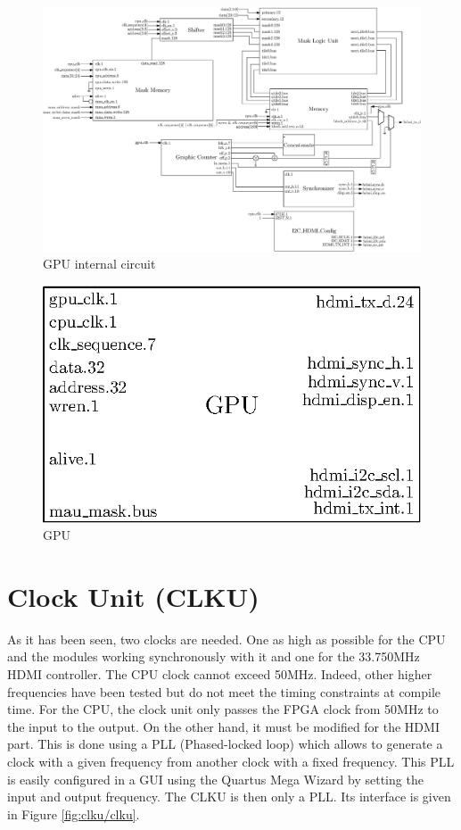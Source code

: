\begin{figure}[H]
    \centering
    \includegraphics[width=\linewidth]{Chapter4-GPU_CLKU/res/gpu_in}
    \caption{GPU internal circuit}
    \label{fig:gpu/gpu_in}
\end{figure}

\begin{figure}[H]
    \centering
    \includegraphics[scale=1.0]{Chapter4-GPU_CLKU/res/gpu}
    \caption{GPU}
    \label{fig:gpu/gpu}
\end{figure}

\section{Clock Unit (CLKU)}

As it has been seen, two clocks are needed. One as high as possible for the CPU and the modules 
working synchronously with it and one for the 33.750MHz HDMI controller. The CPU clock cannot 
exceed 50MHz. Indeed, other higher frequencies have been tested but do not meet the timing 
constraints at compile time. For the CPU, the clock unit only passes the FPGA clock from 50MHz to 
the input to the output. On the other hand, it must be modified for the HDMI part. This is done 
using a PLL (Phased-locked loop) which allows to generate a clock with a given frequency from 
another clock with a fixed frequency. This PLL is easily configured in a GUI using the Quartus 
Mega Wizard by setting the input and output frequency. The CLKU is then only a PLL. Its interface 
is given in Figure \ref{fig:clku/clku}.


